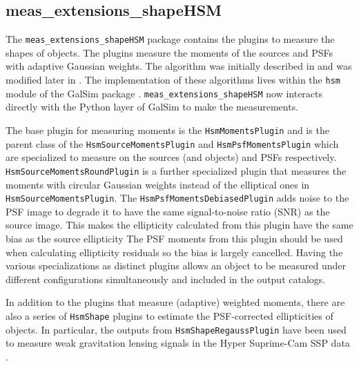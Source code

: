 \subsection{meas\_extensions\_shapeHSM}
\label{sec:meas_extensions_shapeHSM}

The \texttt{meas\_extensions\_shapeHSM} package contains the plugins to measure the shapes of objects.
The plugins measure the moments of the sources and PSFs with adaptive Gaussian weights.
The algorithm was initially described in \citet{2003MNRAS.343..459H} and was modified later in \citet{2005MNRAS.361.1287M}.
The implementation of these algorithms lives within the \texttt{hsm} module of the GalSim package \citep{2015A&C....10..121R}.
\texttt{meas\_extensions\_shapeHSM} now interacts directly with the Python layer of GalSim to make the measurements.

The base plugin for measuring moments is the \texttt{HsmMomentsPlugin} and is the parent class of the \texttt{HsmSourceMomentsPlugin} and \texttt{HsmPsfMomentsPlugin} which are specialized to measure on the sources (and objects) and PSFs respectively.
\texttt{HsmSourceMomentsRoundPlugin} is a further specialized plugin that measures the moments with circular Gaussian weights instead of the elliptical ones in \texttt{HsmSourceMomentsPlugin}.
The \texttt{HsmPsfMomentsDebiasedPlugin} adds noise to the PSF image to degrade it to have the same signal-to-noise ratio (SNR) as the source image.
This makes the ellipticity calculated from this plugin have the same bias as the source ellipticity
The PSF moments from this plugin should be used when calculating ellipticity residuals so the bias is largely cancelled.
Having the various specializations as distinct plugins allows an object to be measured under different configurations simultaneously and included in the output catalogs.

In addition to the plugins that measure (adaptive) weighted moments, there are also a series of \texttt{HsmShape} plugins to estimate the PSF-corrected ellipticities of objects.
In particular, the outputs from \texttt{HsmShapeRegaussPlugin} have been used to measure weak gravitation lensing signals in the Hyper Suprime-Cam SSP data \citep{2018PASJ...70S..25M, 2022PASJ...74..421L}.
